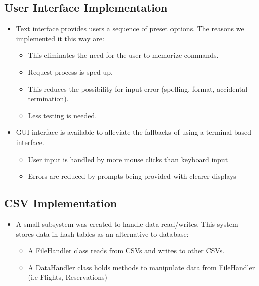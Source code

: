 \documentclass[12pt]{report}
\begin{document}
    \subsection*{User Interface Implementation}\label{subsec:userInterfaceImplementation}
    \begin{itemize}
        \item Text interface provides users a sequence of preset options. The reasons we implemented it this way are:
        \begin{itemize}
            \item This eliminates the need for the user to memorize commands.
            \item Request process is sped up.
            \item This reduces the possibility for input error (spelling, format, accidental termination).
            \item Less testing is needed.
        \end{itemize}
        \item GUI interface is available to alleviate the fallbacks of using a terminal based interface.
        \begin{itemize}
            \item User input is handled by more mouse clicks than keyboard input
            \item Errors are reduced by prompts being provided with clearer displays
        \end{itemize}
    \end{itemize}

    \subsection*{CSV Implementation}\label{subsec:csvImplementation}
    \begin{itemize}
        \item A small subsystem was created to handle data read/writes.
        This system stores data in hash tables as an alternative to database:
        \begin{itemize}
            \item A FileHandler class reads from CSVs and writes to other CSVs.
            \item A DataHandler class holds methods to manipulate data from FileHandler (i.e Flights, Reservations)
        \end{itemize}
    \end{itemize}
\end{document}
